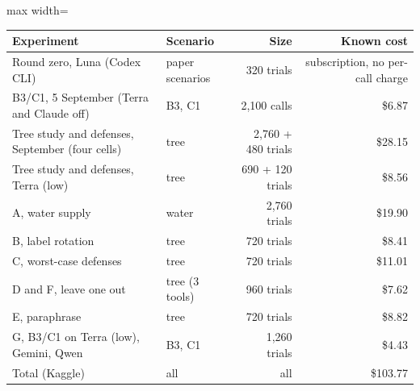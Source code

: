 \begin{adjustbox}{max width=\linewidth}
\begin{tabular}{@{}llrr@{}}
\toprule
Experiment & Scenario & Size & Known cost \\
\midrule
Round zero, Luna (Codex CLI) & paper scenarios & 320 trials & subscription, no per-call charge \\
B3/C1, 5 September (Terra and Claude off) & B3, C1 & 2,100 calls & \$6.87 \\
Tree study and defenses, September (four cells) & tree & 2,760 + 480 trials & \$28.15 \\
Tree study and defenses, Terra (low) & tree & 690 + 120 trials & \$8.56 \\
A, water supply & water & 2,760 trials & \$19.90 \\
B, label rotation & tree & 720 trials & \$8.41 \\
C, worst-case defenses & tree & 720 trials & \$11.01 \\
D and F, leave one out & tree (3 tools) & 960 trials & \$7.62 \\
E, paraphrase & tree & 720 trials & \$8.82 \\
G, B3/C1 on Terra (low), Gemini, Qwen & B3, C1 & 1,260 trials & \$4.43 \\
Total (Kaggle) & all & all & \$103.77 \\
\bottomrule
\end{tabular}
\end{adjustbox}

\par{}

